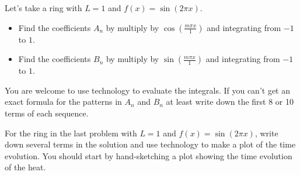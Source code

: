 \begin{problem}
    Let's take a ring with $L = 1$ and $f(x) = \sin(2 \pi x)$.  
    \begin{itemize}
        \item Find the coefficients $A_n$ by multiply by $\cos\left( \frac{m\pi x}{1}
            \right)$ and integrating from $-1$ to $1$.
        \item Find the coefficients $B_n$ by multiply by $\sin\left( \frac{m\pi x}{1}
            \right)$ and integrating from $-1$ to $1$.
    \end{itemize}
    You are welcome to use technology to evaluate the integrals.  If you can't get an
    exact formula for the patterns in $A_n$ and $B_n$ at least write down the first 8 or
    10 terms of each sequence.
\end{problem}

\begin{problem}
    For the ring in the last problem with $L=1$ and $f(x) = \sin(2\pi x)$, write down
    several terms in the solution and use technology to make a plot of the time evolution.
    You should start by hand-sketching a plot showing the time evolution of the heat.
\end{problem}



